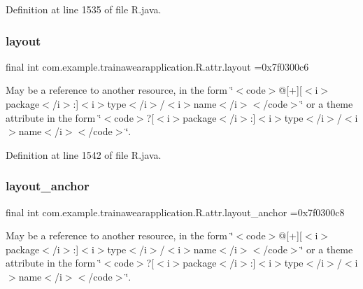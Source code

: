 Definition at line 1535 of file R.\+java.

\mbox{\label{classcom_1_1example_1_1trainawearapplication_1_1_r_1_1attr_aa64f605ae1fcd6070e553cfdcbd37759}} 
\subsubsection{\texorpdfstring{layout}{layout}}
{\footnotesize\ttfamily final int com.\+example.\+trainawearapplication.\+R.\+attr.\+layout =0x7f0300c6\hspace{0.3cm}{\ttfamily [static]}}

May be a reference to another resource, in the form \char`\"{}$<$code$>$@\mbox{[}+\mbox{]}\mbox{[}$<$i$>$package$<$/i$>$\+:\mbox{]}$<$i$>$type$<$/i$>$/$<$i$>$name$<$/i$>$$<$/code$>$\char`\"{} or a theme attribute in the form \char`\"{}$<$code$>$?\mbox{[}$<$i$>$package$<$/i$>$\+:\mbox{]}$<$i$>$type$<$/i$>$/$<$i$>$name$<$/i$>$$<$/code$>$\char`\"{}. 

Definition at line 1542 of file R.\+java.

\mbox{\label{classcom_1_1example_1_1trainawearapplication_1_1_r_1_1attr_a52aba3a039091c72373d231f514108e2}} 
\subsubsection{\texorpdfstring{layout\_anchor}{layout\_anchor}}
{\footnotesize\ttfamily final int com.\+example.\+trainawearapplication.\+R.\+attr.\+layout\+\_\+anchor =0x7f0300c8\hspace{0.3cm}{\ttfamily [static]}}

May be a reference to another resource, in the form \char`\"{}$<$code$>$@\mbox{[}+\mbox{]}\mbox{[}$<$i$>$package$<$/i$>$\+:\mbox{]}$<$i$>$type$<$/i$>$/$<$i$>$name$<$/i$>$$<$/code$>$\char`\"{} or a theme attribute in the form \char`\"{}$<$code$>$?\mbox{[}$<$i$>$package$<$/i$>$\+:\mbox{]}$<$i$>$type$<$/i$>$/$<$i$>$name$<$/i$>$$<$/code$>$\char`\"{}. 

